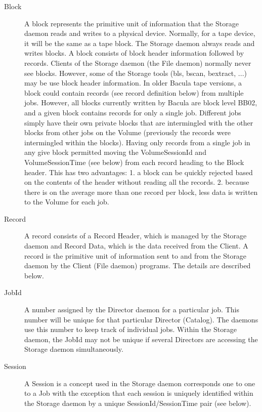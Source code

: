 \begin{description}

\item [Block]
   A block represents the primitive unit of information  that the Storage daemon
reads and writes to a physical  device. Normally, for a tape device, it will
be the same as a  tape block. The Storage daemon always reads and writes
blocks. A block consists of block header information  followed by records.
Clients of the Storage daemon (the  File daemon) normally never see blocks.
However, some  of the Storage tools (bls, bscan, bextract, ...) may  be use
block header information. In older Bacula tape  versions, a block could
contain records (see record definition below)  from multiple  jobs. However,
all blocks currently written by Bacula are  block level BB02, and a given
block contains records for  only a single job. Different jobs simply have
their own private  blocks that are intermingled with the other blocks from
other jobs  on the Volume (previously the records were intermingled within
the blocks). Having only records from a single job in any  give block
permitted moving the VolumeSessionId  and VolumeSessionTime (see below) from
each record heading to  the Block header. This has two advantages: 1. a block
can be  quickly rejected based on the contents of the header without  reading
all the records. 2. because there is on the average  more than one record per
block, less data is written to the  Volume for each job.

\item [Record]
   A record consists of a Record Header, which is managed  by the Storage daemon
and Record Data, which is the data  received from the Client. A record is the
primitive unit  of information sent to and from the Storage daemon by the
Client (File daemon) programs. The details are described below.

\item [JobId]
   A number assigned by the Director daemon for a  particular job. This number
will be unique for  that particular Director (Catalog). The daemons use this
number to keep track of individual jobs. Within the Storage  daemon, the JobId
may not be unique if several Directors are  accessing the Storage daemon
simultaneously.

\item [Session]
   A Session is a concept used in the Storage daemon  corresponds one to one to a
Job with the exception that  each session is uniquely identified within the
Storage  daemon by a unique SessionId/SessionTime pair (see below).


\end{description}
